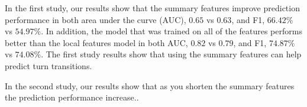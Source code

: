 In the first study, our results show that the summary features improve prediction performance in both area under the curve (AUC), $0.65$ vs $0.63$, and F1, $66.42\%$ vs $54.97\%$. In addition, the model that was trained on all of the features performs better than the local features model in both AUC, $0.82$ vs $0.79$, and F1, $74.87\%$ vs $74.08\%$. The first study results show that using the summary features can help predict turn transitions. 

In the second study, our results show that as you shorten the summary features the prediction performance increase..